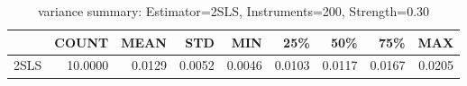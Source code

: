 \begin{table}[ht]
\centering
\caption{variance summary: Estimator=2SLS, Instruments=200, Strength=0.30}
\begin{tabular}{lrrrrrrrr}
\toprule
 & COUNT & MEAN & STD & MIN & 25\% & 50\% & 75\% & MAX \\
\midrule
2SLS & 10.0000 & 0.0129 & 0.0052 & 0.0046 & 0.0103 & 0.0117 & 0.0167 & 0.0205 \\
\bottomrule
\end{tabular}
\end{table}

